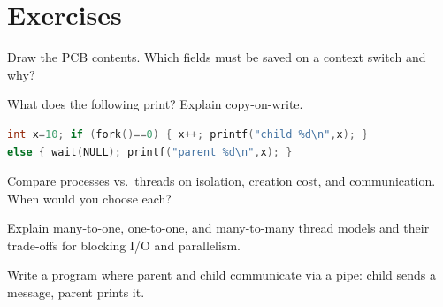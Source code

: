 \section{Exercises}
\label{sec:ch02-ex}
\begin{exercise}
Draw the PCB contents. Which fields must be saved on a context switch and why?
\end{exercise}
\begin{exercise}
What does the following print? Explain copy-on-write.
\begin{lstlisting}[language=C]
int x=10; if (fork()==0) { x++; printf("child %d\n",x); }
else { wait(NULL); printf("parent %d\n",x); }
\end{lstlisting}
\end{exercise}
\begin{exercise}
Compare processes vs.\ threads on isolation, creation cost, and communication.
When would you choose each?
\end{exercise}
\begin{exercise}
Explain many-to-one, one-to-one, and many-to-many thread models and their
trade-offs for blocking I/O and parallelism.
\end{exercise}
\begin{exercise}
Write a program where parent and child communicate via a pipe: child sends a
message, parent prints it.
\end{exercise}
